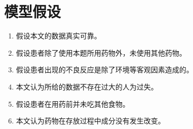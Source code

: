 \section{模型假设}


\begin{enumerate}
  \item 假设本文的数据真实可靠。
  \item 假设患者除了使用本题所用药物外，未使用其他药物。
  \item 假设患者出现的不良反应是除了环境等客观因素造成的。
  \item 本文认为所给的数据不存在过大的人为过失。
  \item 假设患者在用药前并未吃其他食物。
  \item 本文认为药物在存放过程中成分没有发生改变。
\end{enumerate} 